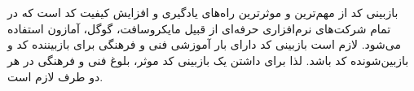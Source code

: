 \section{}
بازبینی کد
از مهم‌ترین و موثرترین راه‌های یادگیری و افزایش کیفیت کد است که در تمام شرکت‌های نرم‌افزاری حرفه‌ای از قبیل مایکروسافت،
گوگل، آمازون استفاده می‌شود. لازم است بازبینی کد دارای بار آموزشی فنی و فرهنگی برای بازبیننده کد
و بازبین‌شونده کد
باشد.  لذا برای داشتن یک
بازبینی کد موثر، بلوغ فنی و فرهنگی در هر دو طرف لازم است.
